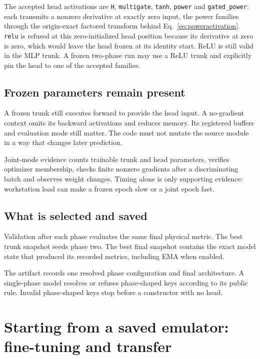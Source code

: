 \documentclass[10pt,aps,prd,twocolumn,nofootinbib]{revtex4-2}
\newcommand{\code}[1]{\texttt{#1}}
\begin{document}
The accepted head activations are \code{H}, \code{multigate}, \code{tanh},
\code{power} and \code{gated\_power}: each transmits a nonzero derivative
at exactly zero input, the power families through the origin-exact
factored transform behind Eq.~\eqref{eq:poweractivation}.
\code{relu} is refused at this zero-initialized head position because its
derivative at zero is zero, which would leave the head frozen at its
identity start.  ReLU is still valid in the MLP trunk.  A frozen two-phase
run may use a ReLU trunk and explicitly pin the head to one of the
accepted families.

\subsection{Frozen parameters remain present}

A frozen trunk still executes forward to provide the head input.  A
no-gradient context omits its backward activations and reduces memory.  Its registered buffers and
evaluation mode still matter.  The code must not mutate the source module in
a way that changes later prediction.

Joint-mode evidence counts trainable trunk and head parameters, verifies
optimizer membership, checks finite nonzero gradients after a discriminating
batch and observes weight changes.  Timing alone is only supporting evidence:
workstation load can make a frozen epoch slow or a joint epoch fast.

\subsection{What is selected and saved}

Validation after each phase evaluates the same final physical metric.  The
best trunk snapshot seeds phase two.  The best final snapshot contains the
exact model state that produced its recorded metrics, including EMA when
enabled.

The artifact records one resolved phase configuration and final architecture.
A single-phase model resolves or
refuses phase-shaped keys according to its public rule.  Invalid phase-shaped
keys stop before a constructor with no head.

\section{Starting from a saved emulator: fine-tuning and transfer}
\label{sec:warmstart}
\end{document}
